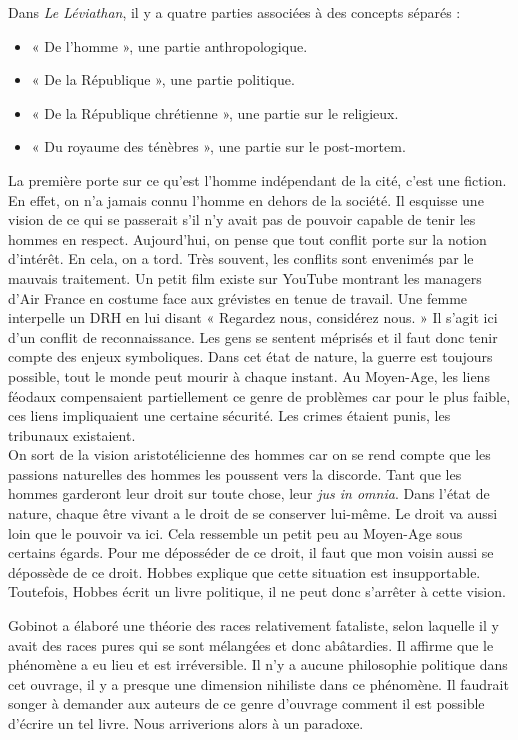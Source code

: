 \documentclass[a4paper,11pt]{article}
\begin{document}
	Dans \textit{Le Léviathan}, il y a quatre parties associées à des concepts séparés :
	\begin{itemize}
	\item « De l’homme », une partie anthropologique.
	\item « De la République », une partie politique.
	\item « De la République chrétienne », une partie sur le religieux.
	\item « Du royaume des ténèbres », une partie sur le post-mortem.
	\end{itemize}
	
	La première porte sur ce qu’est l’homme indépendant de la cité, c’est une fiction. En effet, on n’a jamais connu l’homme en dehors de la société.
	Il esquisse une vision de ce qui se passerait s’il n’y avait pas de pouvoir capable de tenir les hommes en respect.
	Aujourd’hui, on pense que tout conflit porte sur la notion d’intérêt.
	En cela, on a tord. Très souvent, les conflits sont envenimés par le mauvais traitement.
	Un petit film existe sur YouTube montrant les managers d’Air France en costume face aux grévistes en tenue de travail.
	Une femme interpelle un DRH en lui disant « Regardez nous, considérez nous. »
	Il s’agit ici d’un conflit de reconnaissance.
	Les gens se sentent méprisés et il faut donc tenir compte des enjeux symboliques. Dans cet état de nature, la guerre est toujours possible, tout le monde peut mourir à chaque instant.
	Au Moyen-Age, les liens féodaux compensaient partiellement ce genre de problèmes car pour le plus faible, ces liens impliquaient une certaine sécurité. Les crimes étaient punis, les tribunaux existaient.\\

	
	On sort de la vision aristotélicienne des hommes car on se rend compte que les passions naturelles des hommes les poussent vers la discorde. Tant que les hommes garderont leur droit sur toute chose, leur \textit{jus in omnia}. Dans l’état de nature, chaque être vivant a le droit de se conserver lui-même. Le droit va aussi loin que le pouvoir va ici. Cela ressemble un petit peu au Moyen-Age sous certains égards. Pour me déposséder de ce droit, il faut que mon voisin aussi se dépossède de ce droit. Hobbes explique que cette situation est insupportable. Toutefois, Hobbes écrit un livre politique, il ne peut donc s’arrêter à cette vision.
	
	Gobinot a élaboré une théorie des races relativement fataliste, selon laquelle il y avait des races pures qui se sont mélangées et donc abâtardies. Il affirme que le phénomène a eu lieu et est irréversible. Il n’y a aucune philosophie politique  dans cet ouvrage, il y a presque une dimension nihiliste dans ce phénomène. Il faudrait songer à demander aux auteurs de ce genre d’ouvrage comment il est possible d’écrire un tel livre. Nous arriverions alors à un paradoxe.
	
\end{document}
